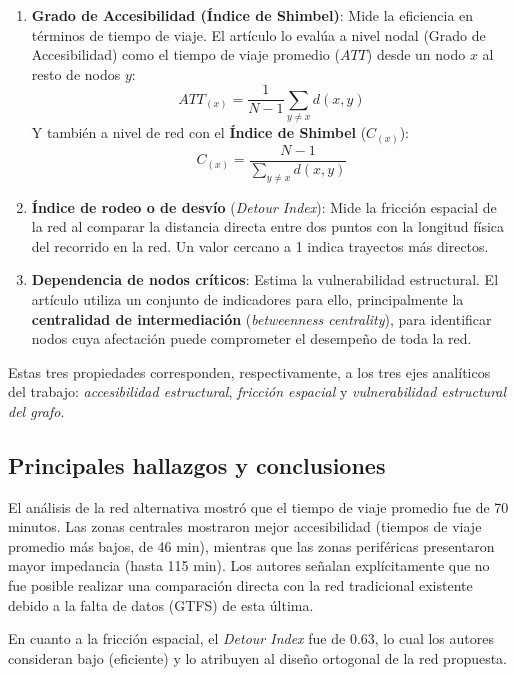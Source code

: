             \begin{enumerate}
                \item \textbf{Grado de Accesibilidad (Índice de Shimbel)}: Mide la eficiencia en términos de tiempo de viaje. El artículo lo evalúa a nivel nodal (Grado de Accesibilidad) como el tiempo de viaje promedio ($ATT$) desde un nodo $x$ al resto de nodos $y$:
                \[
                    ATT_{(x)}=\frac{1}{N-1}\sum_{y\neq x}d(x,y)
                \]
                Y también a nivel de red con el \textbf{Índice de Shimbel} ($C_{(x)}$):
                \[
                    C_{(x)}=\frac{N-1}{\sum_{y\neq x}d(x,y)}
                \]

                \item \textbf{Índice de rodeo o de desvío} (\textit{Detour Index}): Mide la fricción espacial de la red al comparar la distancia directa entre dos puntos con la longitud física del recorrido en la red. Un valor cercano a 1 indica trayectos más directos.

                \item \textbf{Dependencia de nodos críticos}: Estima la vulnerabilidad estructural. El artículo utiliza un conjunto de indicadores para ello, principalmente la \textbf{centralidad de intermediación} (\textit{betweenness centrality}), para identificar nodos cuya afectación puede comprometer el desempeño de toda la red.
            \end{enumerate}

            Estas tres propiedades corresponden, respectivamente, a los tres ejes analíticos del trabajo: \textit{accesibilidad estructural}, \textit{fricción espacial} y \textit{vulnerabilidad estructural del grafo}.

        \subsection{Principales hallazgos y conclusiones}

            El análisis de la red alternativa mostró que el tiempo de viaje promedio fue de 70 minutos. Las zonas centrales mostraron mejor accesibilidad (tiempos de viaje promedio más bajos, de 46 min), mientras que las zonas periféricas presentaron mayor impedancia (hasta 115 min). Los autores señalan explícitamente que no fue posible realizar una comparación directa con la red tradicional existente debido a la falta de datos (GTFS) de esta última.

            En cuanto a la fricción espacial, el \textit{Detour Index} fue de 0.63, lo cual los autores consideran bajo (eficiente) y lo atribuyen al diseño ortogonal de la red propuesta.

